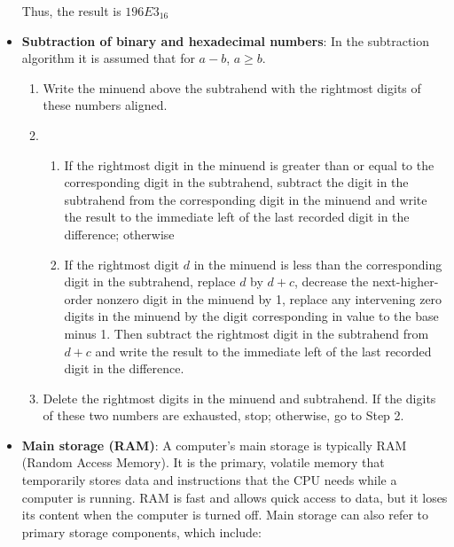 \documentclass{report}
\begin{document}
\begin{itemize}
            \bigbreak \noindent 
            Thus, the result is $196E3_{16} $
        \item \textbf{Subtraction of binary and hexadecimal numbers}: In the subtraction algorithm it is assumed that for $a-b$, $a \geq b$.
            \begin{enumerate}
                \item Write the minuend above the subtrahend with the rightmost digits of these numbers aligned.
                \item \begin{enumerate}[label=(\alph*)]
                        \item If the rightmost digit in the minuend is greater than or equal 
                            to the corresponding digit in the subtrahend, subtract the digit in 
                            the subtrahend from the corresponding digit in the minuend and 
                            write the result to the immediate left of the last recorded digit in 
                            the difference; otherwise
                        \item If the rightmost digit \(d\) in the minuend is less than the 
                            corresponding digit in the subtrahend, replace \(d\) by \(d + c\), decrease the 
                            next-higher-order nonzero digit in the minuend by 1, replace any 
                            intervening zero digits in the minuend by the digit corresponding in 
                            value to the base minus 1. Then subtract the rightmost digit in the 
                            subtrahend from \(d + c\) and write the result to the immediate left of 
                            the last recorded digit in the difference.
                    \end{enumerate}
            \item Delete the rightmost digits in the minuend and subtrahend. If the digits of these two numbers are exhausted, stop; otherwise, go to Step 2.
            \end{enumerate}
        \item \textbf{Main storage (RAM)}: A computer's main storage is typically RAM (Random Access Memory). It is the primary, volatile memory that temporarily stores data and instructions that the CPU needs while a computer is running. RAM is fast and allows quick access to data, but it loses its content when the computer is turned off.
            \bigbreak \noindent 
            Main storage can also refer to primary storage components, which include:

\end{itemize}
\end{document}
